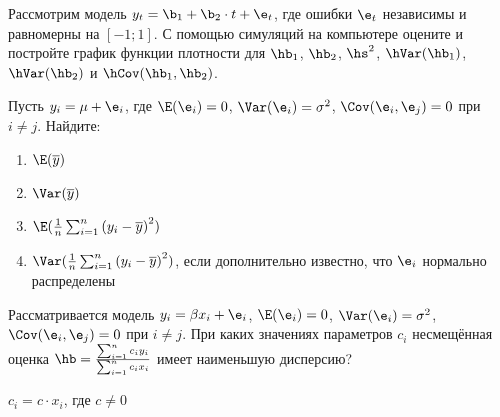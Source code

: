 \documentclass[pdftex,11pt,openany]{book}\usepackage[]{graphicx}\usepackage[]{color}
\begin{document}
\begin{problem}
 Рассмотрим модель $y_t=\b_1+\b_2 \cdot t + \e_t$, где ошибки $\e_t$ независимы и равномерны на $[-1;1]$. С помощью симуляций на компьютере оцените и постройте график функции плотности для $\hb_1$, $\hb_2$, $\hs^2$, $\hVar(\hb_1)$, $\hVar(\hb_2)$ и $\hCov(\hb_1,\hb_2)$.
\end{problem}

\begin{solution}
\end{solution}


\begin{problem}
 Пусть $y_i=\mu+\e_i$, где $\E(\e_i)=0$, $\Var(\e_i)=\sigma^2$, $\Cov(\e_i,\e_j)=0$ при $i \ne j$. Найдите:
\begin{enumerate}
\item $\E(\overline{y})$
\item $\Var(\overline{y})$
\item $\E(\frac{1}{n}\sum_{i=1}^n {(y_i-\overline{y})}^2)$
\item $\Var(\frac{1}{n}\sum_{i=1}^n {(y_i-\overline{y})}^2)$, если дополнительно известно, что $\e_i$ нормально распределены
\end{enumerate}
\end{problem}

\begin{solution}
\end{solution}


\begin{problem}
 Рассматривается модель $y_i=\beta x_i+\e_i$, $\E(\e_i)=0$, $\Var(\e_i)=\sigma^2$, $\Cov(\e_i,\e_j)=0$ при $i \ne j$.
При каких значениях параметров $c_i$ несмещённая оценка $\hb=\frac{\sum_{i=1}^n {c_i y_i}}{\sum_{i=1}^n {c_i x_i}}$ имеет наименьшую дисперсию?
\end{problem}

\begin{solution}
$c_i=c\cdot x_i$, где $c\neq 0$
\end{solution}
\end{document}
